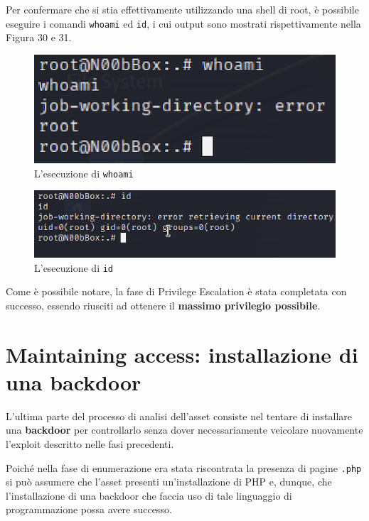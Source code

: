 \documentclass[a4paper, 12pt, oneside]{article}
\begin{document}
Per confermare che si stia effettivamente utilizzando una shell di root, è possibile eseguire i comandi \texttt{whoami} ed \texttt{id}, i cui output sono mostrati rispettivamente nella Figura 30 e 31.

\begin{figure}[h!]
    \centering
    \includegraphics[width=\textwidth]{img/whoami.png}
    \caption{L'esecuzione di \texttt{whoami}}
\end{figure}

\begin{figure}[h!]
    \centering
    \includegraphics[width=\textwidth]{img/id.png}
    \caption{L'esecuzione di \texttt{id}}
\end{figure}

Come è possibile notare, la fase di Privilege Escalation è stata completata con successo, essendo riusciti ad ottenere il \textbf{massimo privilegio possibile}.

\newpage
\section{Maintaining access: installazione di una backdoor}
L'ultima parte del processo di analisi dell'asset consiste nel tentare di installare una \textbf{backdoor} per controllarlo senza dover necessariamente veicolare nuovamente l'exploit descritto nelle fasi precedenti.

Poiché nella fase di enumerazione era stata riscontrata la presenza di pagine \texttt{.php} si può assumere che l'asset presenti un'installazione di PHP e, dunque, che l'installazione di una backdoor che faccia uso di tale linguaggio di programmazione possa avere successo.
\end{document}
